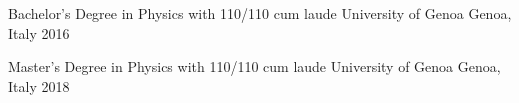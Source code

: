




\begin{cvhonors}


\cvhonor
{Bachelor's Degree in Physics with 110/110 cum laude} %
{University of Genoa} %
{Genoa, Italy} %
{2016} %


\cvhonor
{Master's Degree in Physics with 110/110 cum laude} %
{University of Genoa} %
{Genoa, Italy} %
{2018} %


\end{cvhonors}
